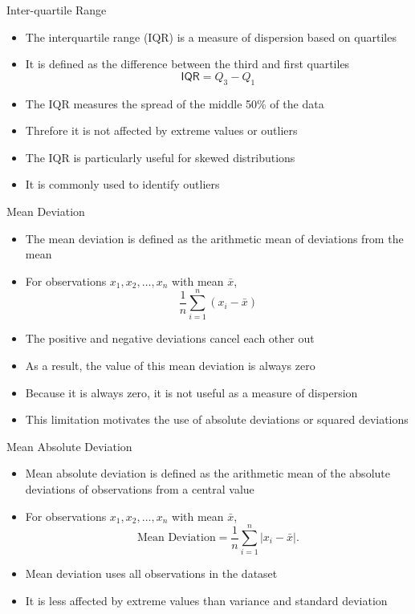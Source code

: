 \documentclass[12pt, aspectratio=169]{beamer}
\begin{document}
    \begin{frame}{Inter-quartile Range}
        \begin{itemize}
            \item The interquartile range (IQR) is a measure of dispersion based on quartiles
            \item It is defined as the difference between the third and first quartiles
            \[
                \textsf{IQR} = Q_3 - Q_1
            \]
            \item The IQR measures the spread of the middle 50\% of the data
            \item Threfore it is not affected by extreme values or outliers
            \item The IQR is particularly useful for skewed distributions
            \item It is commonly used to identify outliers
        \end{itemize}
    \end{frame}


    \begin{frame}{Mean Deviation}
        \begin{itemize}
            \item The mean deviation is defined as the arithmetic mean of deviations from the mean
            \item For observations $x_1, x_2, \dots, x_n$ with mean $\bar{x}$,
            \[
                \frac{1}{n} \sum_{i=1}^{n} (x_i - \bar{x})
            \]
            \item The positive and negative deviations cancel each other out
            \item As a result, the value of this mean deviation is always zero
            \item Because it is always zero, it is not useful as a measure of dispersion
            \item This limitation motivates the use of absolute deviations or squared deviations
        \end{itemize}
    \end{frame}


    \begin{frame}{Mean Absolute Deviation}
        \begin{itemize}
            \item Mean absolute deviation is defined as the arithmetic mean of the absolute deviations of observations from a central value
            \item For observations $x_1, x_2, \dots, x_n$ with mean $\bar{x}$,
            \[
                \text{Mean Deviation} = \frac{1}{n} \sum_{i=1}^{n} |x_i - \bar{x}|.
            \]
            \item Mean deviation uses all observations in the dataset
            \item It is less affected by extreme values than variance and standard deviation
        \end{itemize}
    \end{frame}
\end{document}
